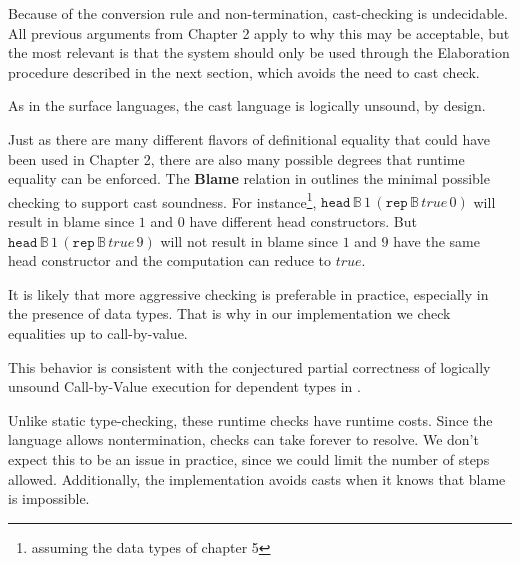 

Because of the conversion rule and non-termination, cast-checking is undecidable.
All previous arguments from Chapter 2 apply to why this may be acceptable, but the most relevant is that the system should only be used through the Elaboration procedure described in the next section, which avoids the need to cast check.


As in the surface languages, the cast language is logically unsound, by design.

Just as there are many different flavors of definitional equality that could have been used in Chapter 2, there are also many possible degrees that runtime equality can be enforced.
The \textbf{Blame} relation in  outlines the minimal possible checking to support cast soundness.
For instance\footnote{assuming the data types of chapter 5}, $\mathtt{head}\,\mathbb{B}\,1\,\left(\mathtt{rep}\,\mathbb{B}\,true\,0\right)$ will result in blame since $1$ and $0$ have different head constructors.
But $\mathtt{head}\,\mathbb{B}\,1\,\left(\mathtt{rep}\,\mathbb{B}\,true\,9\right)$ will not result in blame since $1$ and $9$ have the same head constructor and the computation can reduce to $true$. 

It is likely that more aggressive checking is preferable in practice, especially in the presence of data types.
That is why in our implementation we check equalities up to call-by-value. 

This behavior is consistent with the conjectured partial correctness of logically unsound Call-by-Value execution for dependent types in \cite{jia2010dependent}. 


Unlike static type-checking, these runtime checks have runtime costs.
Since the language allows nontermination, checks can take forever to resolve.
We don't expect this to be an issue in practice, since we could limit the number of steps allowed.
Additionally, the implementation avoids casts when it knows that blame is impossible.